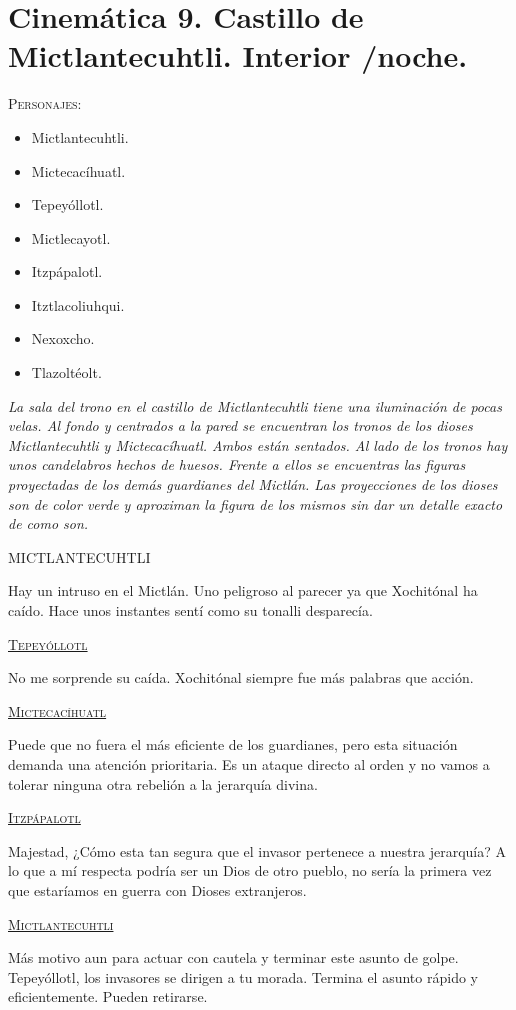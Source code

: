 \documentclass[11pt,letterpaper]{article}
\begin{document}
 
 \section{Cinemática 9. Castillo de Mictlantecuhtli. Interior /noche.}
  \textsc{Personajes}:
  \begin{itemize}
  \item Mictlantecuhtli.
	\item Mictecacíhuatl.
	\item Tepeyóllotl.
	\item Mictlecayotl.
	\item Itzpápalotl.
	\item Itztlacoliuhqui.
	\item Nexoxcho.
	\item Tlazoltéolt.
  \end{itemize}
  
  \textit{La sala del trono en el castillo de Mictlantecuhtli tiene una iluminación de pocas velas. Al fondo y centrados a la pared se encuentran los tronos de los dioses Mictlantecuhtli y Mictecacíhuatl. Ambos están sentados. Al lado de los tronos hay unos candelabros hechos de huesos. Frente a ellos se encuentras las figuras proyectadas de los demás guardianes del Mictlán. Las proyecciones de los dioses son de color verde y aproximan la figura de los mismos sin dar un detalle exacto de como son.}
  
\begin{center}
	MICTLANTECUHTLI
	\\
\par
Hay un intruso en el Mictlán. Uno peligroso al parecer ya que Xochitónal ha caído. Hace unos instantes sentí como su tonalli desparecía.  
\\
\par
\textsc{\underline{Tepeyóllotl}}
\\
\par
No me sorprende su caída. Xochitónal siempre fue más palabras que acción.
\\
\par
\textsc{\underline{Mictecacíhuatl}}
\\
\par
Puede que no fuera el más eficiente de los guardianes, pero esta situación demanda una atención prioritaria. Es un ataque directo al orden y no vamos a tolerar ninguna otra rebelión a la jerarquía divina.
\\
\par
\textsc{\underline{Itzpápalotl}}
\\
\par
Majestad, ¿Cómo esta tan segura que el invasor pertenece a nuestra jerarquía? A lo que a mí respecta podría ser un Dios de otro pueblo, no sería la primera vez que estaríamos en guerra con Dioses extranjeros.
\\
\par
\textsc{\underline{Mictlantecuhtli}}
\\
\par
Más motivo aun para actuar con cautela y terminar este asunto de golpe. Tepeyóllotl, los invasores se dirigen a tu morada. Termina el asunto rápido y eficientemente. Pueden retirarse.
\end{center}
\end{document}
